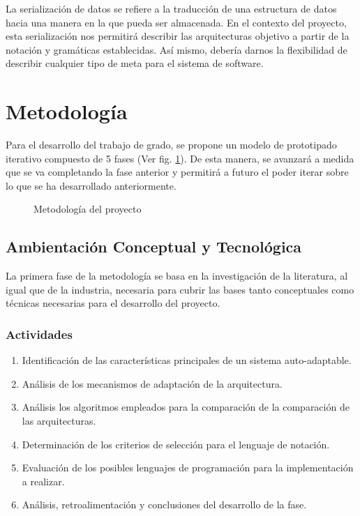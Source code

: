 \documentclass[12pt]{article}
\begin{document}

    La serialización de datos se refiere a la traducción de una estructura de datos hacia una manera en la que pueda ser almacenada. En el contexto del proyecto, esta serialización nos permitirá describir las arquitecturas objetivo a partir de la notación y gramáticas establecidas. Así mismo, debería darnos la flexibilidad de describir cualquier tipo de meta para el sistema de software.
    

    \section{Metodología}

    Para el desarrollo del trabajo de grado, se propone un modelo de prototipado iterativo compuesto de 5 fases (Ver fig. \ref{fig:met}). De esta manera, se avanzará a medida que se va completando la fase anterior y permitirá a futuro el poder iterar sobre lo que se ha desarrollado anteriormente.

    \begin{figure}[H]
        \centering
        
        \caption{Metodología del proyecto}
        \label{fig:met}
    \end{figure}

    \subsection{Ambientación Conceptual y Tecnológica}

    La primera fase de la metodología se basa en la investigación de la literatura, al igual que de la industria, necesaria para cubrir las bases tanto conceptuales como técnicas necesarias para el desarrollo del proyecto. 

    \subsubsection*{Actividades}

    \begin{enumerate}[label=\thesubsection.\arabic*., wide, labelindent=2em, leftmargin=5em]
        \item Identificación de las características principales de un sistema auto-adaptable.
        \item Análisis de los mecanismos de adaptación de la arquitectura.
        \item Análisis los algoritmos empleados para la comparación de la comparación de las arquitecturas.
        \item Determinación de los criterios de selección para el lenguaje de notación.
        \item Evaluación de los posibles lenguajes de programación para la implementación a realizar.
        \item Análisis, retroalimentación y conclusiones del desarrollo de la fase. 
    \end{enumerate} 
\end{document}
